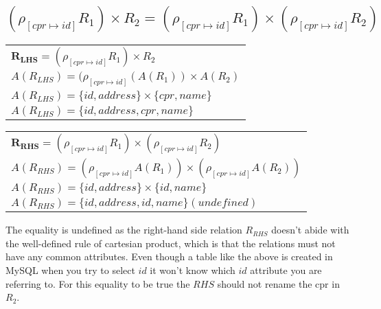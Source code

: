 \subsection{\normalsize{$(\rho_{[cpr \mapsto id]}R_1) \times R_2 = (\rho_{[cpr \mapsto id]}R_1) \times (\rho_{[cpr \mapsto id]}R_2)$}}

\begin{table}[ht]
	\begin{tabular}{|l|}
		$\bm{R_{LHS}} = (\rho_{[cpr \mapsto id]}R_1) \times R_2$ \\[0.2cm]
		$A(R_{LHS}) = (\rho_{[cpr\mapsto id]}(A(R_1)) \times A(R_2)$  \\[0.2cm]
		$A(R_{LHS}) = \{id, address\} \times \{cpr, name\}$  \\[0.2cm]
		$A(R_{LHS}) = \{id, address, cpr, name\}$
	\end{tabular}
\end{table}

\begin{table}[ht]
	\begin{tabular}{|l|}
		$\bm{R_{RHS}} = (\rho_{[cpr \mapsto id]}R_1) \times (\rho_{[cpr \mapsto id]}R_2)$ \\[0.2cm]
		$A(R_{RHS}) = (\rho_{[cpr\mapsto id]}A(R_1)) \times (\rho_{[cpr \mapsto id]}A(R_2))$ \\[0.2cm]
		$A(R_{RHS}) = \{id, address\} \times \{id, name\}$ \\[0.2cm]
		$A(R_{RHS}) = \{id, address, id, name\}(undefined)$ 
	\end{tabular}
\end{table}
\FloatBarrier

The equality is undefined as the right-hand side relation $R_{RHS}$ doesn't abide with the well-defined rule of cartesian product, which is that the relations must not have any common attributes. Even though a table like the above is created in MySQL when you try to select $id$ it won't know which $id$ attribute you are referring to.
For this equality to be true the $RHS$ should not rename the cpr in $R_2$.\\\\
